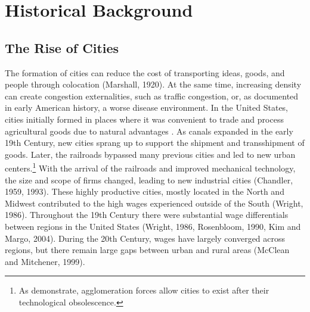 \documentclass[12pt,twoside]{article}
\begin{document}
 

 

	
\section{Historical Background}


\subsection{The Rise of Cities}

The formation of cities can reduce the cost of transporting ideas, goods, and people through colocation (Marshall, 1920).
At the same time, increasing density can create congestion externalities, such as traffic congestion, or, as documented in early American history, a worse disease environment. 
In the United States, cities initially formed in places where it was convenient to trade and process agricultural goods due to natural advantages \citep{Boustan_Bunten_Hearey_2013}.
As canals expanded in the early 19th Century, new cities sprang up to support the shipment and transshipment of goods. 
Later, the railroads bypassed many previous cities and led to new urban centers.\footnote{As \citet{bleakley2012portage} demonstrate, agglomeration forces allow cities to exist after their technological obsolescence.}  
With the arrival of the railroads and improved mechanical technology, the size and scope of firms changed, leading to new industrial cities (Chandler, 1959, 1993).  
These highly productive cities, mostly located in the North and Midwest contributed to the high wages experienced outside of the South (Wright, 1986). %
Throughout the 19th Century there were substantial wage differentials between regions in the United States (Wright, 1986, Rosenbloom, 1990, Kim and Margo, 2004).
During the 20th Century, wages have largely converged across regions, but there remain large gaps between urban and rural areas (McClean and Mitchener, 1999). 

\end{document}
